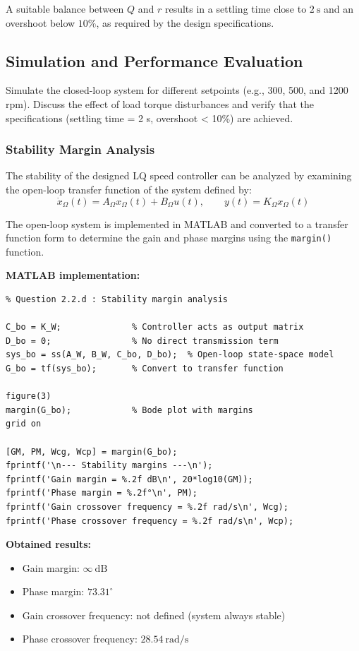 \documentclass{rapportCS}
\begin{document}
A suitable balance between $Q$ and $r$ results in a settling time close to
$2~\mathrm{s}$ and an overshoot below $10\%$, as required by the design specifications.


\subsection{Simulation and Performance Evaluation}
Simulate the closed-loop system for different setpoints (e.g., 300, 500, and 1200 rpm).  
Discuss the effect of load torque disturbances and verify that the specifications (settling time = 2 s, overshoot < 10\%) are achieved.
\subsubsection{Stability Margin Analysis}

The stability of the designed LQ speed controller can be analyzed by examining the open-loop transfer function of the system defined by:
\begin{equation*}
\dot{x}_\Omega(t) = A_\Omega x_\Omega(t) + B_\Omega u(t),
\qquad
y(t) = K_\Omega x_\Omega(t)
\end{equation*}

The open-loop system is implemented in MATLAB and converted to a transfer function form to determine the gain and phase margins using the \texttt{margin()} function.

\noindent\textbf{MATLAB implementation:}
\begin{verbatim}
% Question 2.2.d : Stability margin analysis

C_bo = K_W;              % Controller acts as output matrix
D_bo = 0;                % No direct transmission term
sys_bo = ss(A_W, B_W, C_bo, D_bo);  % Open-loop state-space model
G_bo = tf(sys_bo);       % Convert to transfer function

figure(3)
margin(G_bo);            % Bode plot with margins
grid on

[GM, PM, Wcg, Wcp] = margin(G_bo);
fprintf('\n--- Stability margins ---\n');
fprintf('Gain margin = %.2f dB\n', 20*log10(GM));
fprintf('Phase margin = %.2f°\n', PM);
fprintf('Gain crossover frequency = %.2f rad/s\n', Wcg);
fprintf('Phase crossover frequency = %.2f rad/s\n', Wcp);
\end{verbatim}

\noindent\textbf{Obtained results:}
\begin{itemize}
    \item Gain margin: $\infty~\mathrm{dB}$
    \item Phase margin: $73.31^{\circ}$
    \item Gain crossover frequency: not defined (system always stable)
    \item Phase crossover frequency: $28.54~\mathrm{rad/s}$
\end{itemize}
\end{document}
